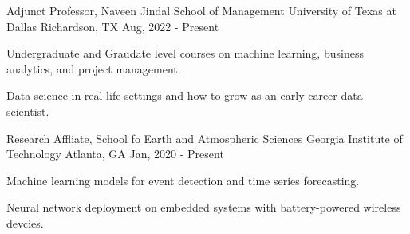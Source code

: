

\begin{cventries}

  \cventry
    {Adjunct Professor, Naveen Jindal School of Management} %
    {University of Texas at Dallas} %
    {Richardson, TX} %
    {Aug, 2022 - Present} %
    {
      \begin{cvitems} %
        \item {Undergraduate and Graudate level courses on machine learning, business analytics, and project management.}
				\item {Data science in real-life settings and how to grow as an early career data scientist.}
      \end{cvitems}
    }

  \cventry
    {Research Affliate, School fo Earth and Atmospheric Sciences} %
    {Georgia Institute of Technology} %
    {Atlanta, GA} %
    {Jan, 2020 - Present} %
    {
      \begin{cvitems} %
        \item {Machine learning models for event detection and time series forecasting.}
				\item {Neural network deployment on embedded systems with battery-powered wireless devcies.}
      \end{cvitems}
    }

%

\end{cventries}

